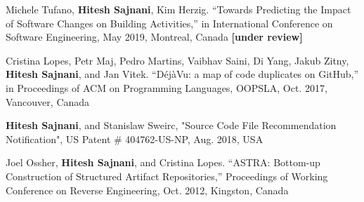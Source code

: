 \documentclass[a4paper]{article}
\begin{document}
\begin{small}
\begin{thebibliography}{}
Michele Tufano, \textbf{Hitesh Sajnani}, Kim Herzig. “Towards Predicting the Impact of Software Changes on Building Activities,” in International Conference on Software Engineering, May 2019, Montreal, Canada \textbf{[under review]}

Cristina Lopes, Petr Maj, Pedro Martins, Vaibhav Saini, Di Yang, Jakub Zitny, \textbf{Hitesh Sajnani}, and Jan Vitek. “DéjàVu: a map of code duplicates on GitHub,” in Proceedings of ACM on Programming Languages, OOPSLA, Oct. 2017, Vancouver, Canada


\textbf{Hitesh Sajnani}, and Stanislaw Sweirc, "Source Code File Recommendation Notification",   US Patent \# 404762-US-NP, Aug. 2018, USA

Joel Ossher, \textbf{Hitesh Sajnani}, and Cristina Lopes. “ASTRA: Bottom-up Construction
of Structured Artifact Repositories,” Proceedings of Working Conference on Reverse
Engineering, Oct. 2012, Kingston, Canada 

\end{thebibliography}
\end{small}
\end{document}
